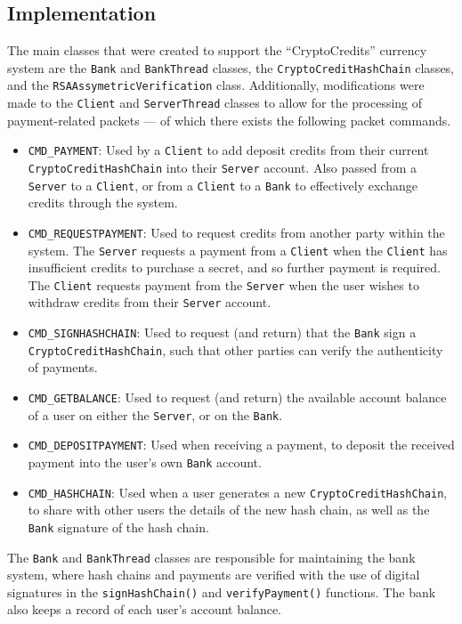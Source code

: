 \documentclass[a4paper,11pt]{article}
\begin{document}
\subsection{Implementation}
The main classes that were created to support the ``CryptoCredits'' currency 
system are the \verb+Bank+ and \verb+BankThread+ classes, the 
\verb+CryptoCreditHashChain+ classes, and the \verb+RSAAssymetricVerification+ 
class. Additionally, modifications were made to the \verb+Client+ and 
\verb+ServerThread+ classes to allow for the processing of payment-related 
packets --- of which there exists the following packet commands.

\begin{itemize}
\item \verb+CMD_PAYMENT+: Used by a \verb+Client+ to add deposit credits from 
their current \verb+CryptoCreditHashChain+ into their \verb+Server+ account. 
Also passed from a \verb+Server+ to a \verb+Client+, or from a \verb+Client+ to 
a \verb+Bank+ to effectively exchange credits through the system.
\item \verb+CMD_REQUESTPAYMENT+: Used to request credits from another party 
within the system. The \verb+Server+ requests a payment from a \verb+Client+ 
when the \verb+Client+ has insufficient credits to purchase a secret, and so 
further payment is required. The \verb+Client+ requests payment from the 
\verb+Server+ when the user wishes to withdraw credits from their \verb+Server+ 
account.
\item \verb+CMD_SIGNHASHCHAIN+: Used to request (and return) that the 
\verb+Bank+ sign a \verb+CryptoCreditHashChain+, such that other parties can 
verify the authenticity of payments.
\item \verb+CMD_GETBALANCE+: Used to request (and return) the available account 
balance of a user on either the \verb+Server+, or on the \verb+Bank+.
\item \verb+CMD_DEPOSITPAYMENT+: Used when receiving a payment, to deposit the 
received payment into the user's own \verb+Bank+ account.
\item \verb+CMD_HASHCHAIN+: Used when a user generates a new 
\verb+CryptoCreditHashChain+, to share with other users the details of the new
hash chain, as well as the \verb+Bank+ signature of the hash chain.
\end{itemize}

The \verb+Bank+ and \verb+BankThread+ classes are responsible for maintaining 
the bank system, where hash chains and payments are verified with the use of 
digital signatures in the \verb+signHashChain()+ and \verb+verifyPayment()+ 
functions. The bank also keeps a record of each user's account balance.
\end{document}

